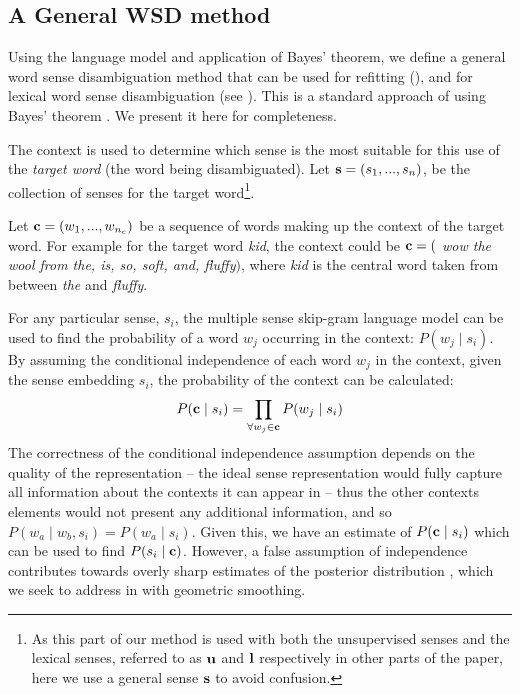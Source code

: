 {\subsection{A General WSD method} \label{generalwsd}
Using the language model and application of Bayes' theorem, we define a general word sense disambiguation method that can be used for refitting (), and for lexical word sense disambiguation (see ).
This is a standard approach of using Bayes' theorem \parencite{tian2014probabilistic,AdaGrams}.
We present it here for completeness.

The context is used to determine which sense is the most suitable for this use of the \emph{target word} (the word being disambiguated).
Let $\mathbf{s}=(s_{1},...,s_{n})$, be the collection of senses for the target word\footnote{As this part of our method is used with both the unsupervised senses and the lexical senses, referred to as $\mathbf{u}$ and $\mathbf{l}$ respectively in other parts of the paper, here we use a general sense $\mathbf{s}$ to avoid confusion.}.

Let $\mathbf{c}=(w_{1},...,w_{n_c})$ be a sequence of words making up the context of the target word.
For example for the target word \emph{kid}, the context could be $\mathbf{c}=($ \emph{ wow the wool from the, is, so, soft, and, fluffy}$)$, where \emph{kid} is the central word taken from between \emph{the} and \emph{fluffy}.

For any particular sense, $s_i$, the multiple sense skip-gram language model can be used to find the probability of a word $w_j$ occurring in the context: $P(w_j \mid s_i)$.
By assuming the conditional independence of each word $w_j$ in the context, given the sense embedding $s_i$, the probability of the context can be calculated:
\begin{equation} \label{eq:contextprobtrue}
P(\mathbf{c} \mid s_{i})=\prod_{\forall w_{j}\in\mathbf{c}}P(w_{j} \mid s_{i})
\end{equation}
The correctness of the conditional independence assumption depends on the quality of the representation -- the ideal sense representation would fully capture all information about the contexts it can appear in -- thus  the other contexts elements would not present any additional information, and so  $P(w_a \mid w_b,s_i)=P(w_a \mid s_i)$.
Given this, we have an estimate of $P(\mathbf{c} \mid s_{i})$ which can be used to find $P(s_i \mid \mathbf{c})$.
However, a false assumption of independence contributes towards overly sharp estimates of the posterior distribution \cite{rosenfeld2000two}, which we seek to address in  with geometric smoothing.


}
